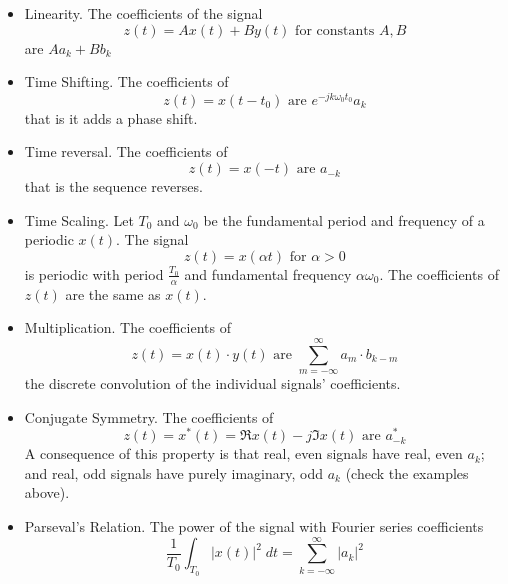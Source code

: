 \begin{itemize}
\item Linearity. The coefficients of the signal
  \[
  z(t) = Ax(t) + By(t) \mbox{ for constants } A,B 
  \]
  are $Aa_k + Bb_k$
\item Time Shifting. The coefficients of
  \[
  z(t) = x(t-t_0) \mbox{ are } e^{-jk\omega_0 t_0}a_k
  \]
  that is it adds a phase shift.
\item Time reversal. The coefficients of
  \[
  z(t) = x(-t) \mbox{ are } a_{-k}
  \]
  that is the sequence reverses.
\item Time Scaling. Let $T_0$ and $\omega_0$ be the fundamental period and frequency of a periodic $x(t)$. The signal 
  \[
  z(t) = x(\alpha t) \mbox{ for } \alpha > 0
  \]
  is periodic with period $\frac{T_0}{\alpha}$ and fundamental frequency $\alpha\omega_0$.
  The coefficients of $z(t)$ are the same as $x(t)$.
\item Multiplication. The coefficients of
  \[
  z(t) = x(t) \cdot y(t) \mbox{ are } \sum\limits_{m = -\infty}^{\infty} a_m\cdot b_{k-m}
  \]
  the discrete convolution of the individual signals' coefficients.
\item Conjugate Symmetry. The coefficients of
  \[
  z(t) = x^*(t) = \Re{x(t)} - j\Im{x(t)} \mbox{ are } a_{-k}^*
  \]
  A consequence of this property is that real, even signals have real, even $a_k$; and real, odd signals have purely imaginary, odd $a_k$ (check the examples above).
\item Parseval's Relation. The power of the signal with Fourier series coefficients
  \[
  \frac{1}{T_0} \int_{T_0} |x(t)|^2\;dt = \sum\limits_{k = -\infty}^{\infty} |a_k|^2
  \]
\end{itemize}



